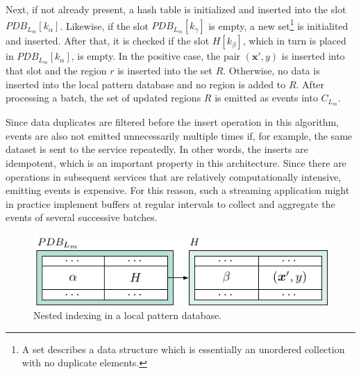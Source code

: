 Next, if not already present, a hash table is initialized and inserted into the slot $PDB_{L_m}[k_\alpha]$. Likewise, if the slot $PDB_{L_m}[k_\gamma]$ is empty, a new set\footnote{A set describes a data structure which is essentially an unordered collection with no duplicate elements.} is initialited and inserted. After that, it is checked if the slot $H[k_\beta]$, which in turn is placed in $PDB_{L_m}[k_\alpha]$, is empty. In the positive case, the pair $(\bm{x}', y)$ is inserted into that slot and the region $r$ is inserted into the set $R$. Otherwise, no data is inserted into the local pattern database and no region is added to $R$. After processing a batch, the set of updated regions $R$ is emitted as events into $C_{L_m}$.

Since data duplicates are filtered before the insert operation in this algorithm, events are also not emitted unnecessarily multiple times if, for example, the same dataset is sent to the service repeatedly. In other words, the inserts are idempotent, which is an important property in this architecture. Since there are operations in subsequent services that are relatively computationally intensive, emitting events is expensive. For this reason, such a streaming application might in practice implement buffers at regular intervals to collect and aggregate the events of several successive batches.



\begin{figure}[t]
    \centering
    \includegraphics[width=0.8\linewidth]{tikz/indexing.pdf}
    \caption{Nested indexing in a local pattern database.}
    \label{fig:indexing}
\end{figure}

